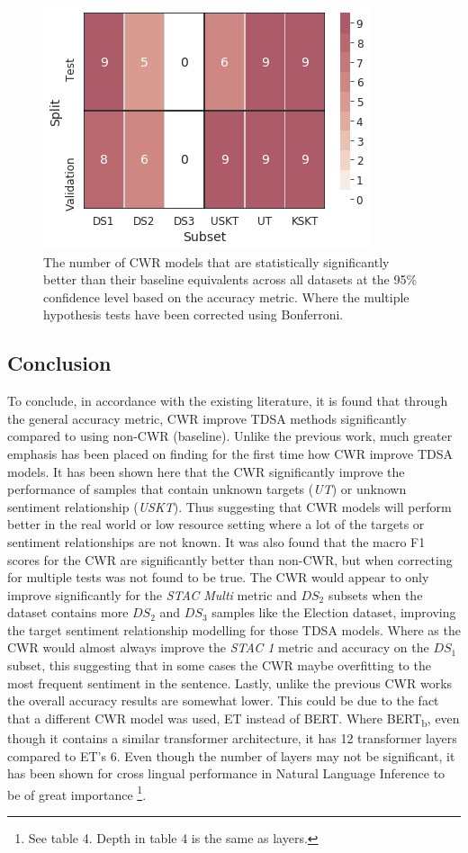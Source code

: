 \begin{figure}[!h]
    \centering
    \includegraphics[scale=0.6]{images/augmentation/methods_performance/CWR/cwr_combined_sig_error_splits.png}
    \caption{The number of CWR models that are statistically significantly better than their baseline equivalents across all datasets at the 95\% confidence level based on the accuracy metric. Where the multiple hypothesis tests have been corrected using Bonferroni.}
    \label{fig:aug_cwr_combined_sig_error_splits}
\end{figure}

\FloatBarrier
\subsection{Conclusion}
To conclude, in accordance with the existing literature, it is found that through the general accuracy metric, CWR improve TDSA methods significantly compared to using non-CWR (baseline). Unlike the previous work, much greater emphasis has been placed on finding for the first time how CWR improve TDSA models. It has been shown here that the CWR significantly improve the performance of samples that contain unknown targets (\textit{UT}) or unknown sentiment relationship (\textit{USKT}). Thus suggesting that CWR models will perform better in the real world or low resource setting where a lot of the targets or sentiment relationships are not known. It was also found that the macro F1 scores for the CWR are significantly better than non-CWR, but when correcting for multiple tests was not found to be true. The CWR would appear to only improve significantly for the \textit{STAC Multi} metric and $DS_2$ subsets when the dataset contains more $DS_2$ and $DS_3$ samples like the Election dataset, improving the target sentiment relationship modelling for those TDSA models. Where as the CWR would almost always improve the \textit{STAC 1} metric and accuracy on the $DS_1$ subset, this suggesting that in some cases the CWR maybe overfitting to the most frequent sentiment in the sentence. Lastly, unlike the previous CWR works the overall accuracy results are somewhat lower. This could be due to the fact that a different CWR model was used, ET instead of BERT. Where BERT\textsubscript{b}, even though it contains a similar transformer architecture, it has 12 transformer layers compared to ET's 6. Even though the number of layers may not be significant, it has been shown for cross lingual performance in Natural Language Inference to be of great importance \citep{wang2019cross} \footnote{See table 4. Depth in table 4 is the same as layers.}. 

